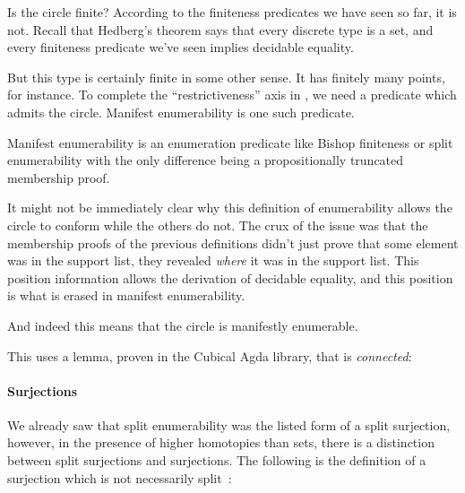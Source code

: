 Is the circle finite?
According to the finiteness predicates we have seen so far, it is not.
Recall that Hedberg's theorem says that every discrete type is a set, and
every finiteness predicate we've seen implies decidable
equality.

But this type is certainly finite in some other sense.
It has finitely many points, for instance.
To complete the ``restrictiveness'' axis in , we
need a predicate which admits the circle.
Manifest enumerability is one such predicate.
\begin{definition}
  Manifest enumerability is an enumeration predicate like Bishop finiteness or
  split enumerability with the only difference being a propositionally truncated
  membership proof.
\end{definition}

It might not be immediately clear why this definition of enumerability allows
the circle to conform while the others do not.
The crux of the issue was that the membership proofs of the previous definitions
didn't just prove that some element was in the support list, they revealed
\emph{where} it was in the support list.
This position information allows the derivation of decidable equality, and this
position is what is erased in manifest enumerability.

And indeed this means that the circle is manifestly enumerable.

This uses a lemma, proven in the Cubical Agda library, that
 is \emph{connected}:

\paragraph{Surjections}
We already saw that split enumerability was the listed form of a split
surjection, however, in the presence of higher homotopies than sets, there is a
distinction between split surjections and surjections.
The following is the definition of a surjection which is not necessarily
split~\cite[definition 4.6.1]{hottbook}:
\begin{paracol}{2}
  \switchcolumn%
\end{paracol}

